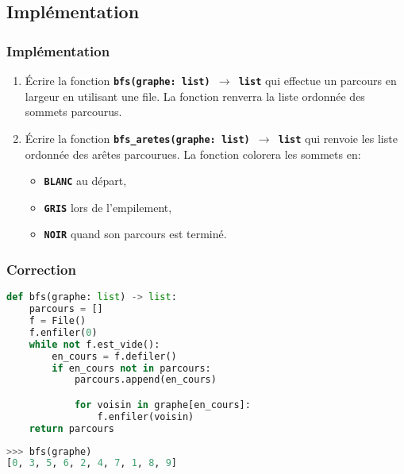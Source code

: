 \documentclass[svgnames,11pt]{beamer}
\begin{document}
\subsection{Implémentation}
\begin{frame}
    \frametitle{Implémentation}

    \begin{activite}
        \begin{enumerate}
            \item Écrire la fonction \textbf{\texttt{bfs(graphe: list) $\rightarrow$ list}} qui effectue un parcours en largeur en utilisant une file. La fonction renverra la liste ordonnée des sommets parcourus.
            \item Écrire la fonction \textbf{\texttt{bfs\_aretes(graphe: list) $\rightarrow$ list}} qui renvoie les liste ordonnée des arêtes parcourues. La fonction colorera les sommets en:
            \begin{itemize}
                \item \textbf{\texttt{BLANC}} au départ,
                \item \textbf{\texttt{GRIS}} lors de l'empilement,
                \item \textbf{\texttt{NOIR}} quand son parcours est terminé.
            \end{itemize}
        \end{enumerate}
        \end{activite}

\end{frame}
\begin{frame}[fragile]
    \frametitle{Correction}
\begin{center}
\begin{lstlisting}[language=Python , basicstyle=\ttfamily\small, xleftmargin=2em, xrightmargin=2em]
def bfs(graphe: list) -> list:
    parcours = []
    f = File()
    f.enfiler(0)
    while not f.est_vide():
        en_cours = f.defiler()
        if en_cours not in parcours:
            parcours.append(en_cours)

            for voisin in graphe[en_cours]:
                f.enfiler(voisin)
    return parcours
\end{lstlisting}
\begin{lstlisting}[language=Python , basicstyle=\ttfamily\small, xleftmargin=2em, xrightmargin=2em]
>>> bfs(graphe)
[0, 3, 5, 6, 2, 4, 7, 1, 8, 9]
\end{lstlisting}
\end{center}
    

\end{frame}
\end{document}
